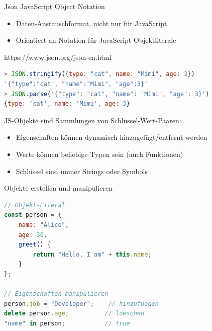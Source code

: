 \begin{concept}{Json}
    JavaScript Object Notation
    \begin{itemize}
    \item Daten-Austauschformat, nicht nur für JavaScript
    \item Orientiert an Notation für JavaScript-Objektliterale
  \end{itemize}
  https://www.json.org/json-en.html
\begin{lstlisting}[language=JavaScript, style=basesmol]
> JSON.stringify({type: "cat", name: "Mimi", age: 3})
'{"type":"cat", "name":"Mimi", "age":3}'
> JSON.parse('{"type": "cat", "name": "Mimi", "age": 3}')
{type: 'cat', name: 'Mimi', age: 3}
\end{lstlisting}
\end{concept}

\begin{definition}{JS-Objekte}
    sind Sammlungen von Schlüssel-Wert-Paaren:
    \begin{itemize}
        \item Eigenschaften können dynamisch hinzugefügt/entfernt werden
        \item Werte können beliebige Typen sein (auch Funktionen)
        \item Schlüssel sind immer Strings oder Symbols
    \end{itemize}
\end{definition}

\begin{examplecode}{Objekte erstellen und manipulieren}
\begin{lstlisting}[language=JavaScript, style=basesmol]
// Objekt-Literal
const person = {
    name: "Alice",
    age: 30,
    greet() {
        return "Hello, I am" + this.name;
    }
};

// Eigenschaften manipulieren
person.job = "Developer";    // hinzufuegen
delete person.age;          // loeschen
"name" in person;           // true
\end{lstlisting}
\end{examplecode}

